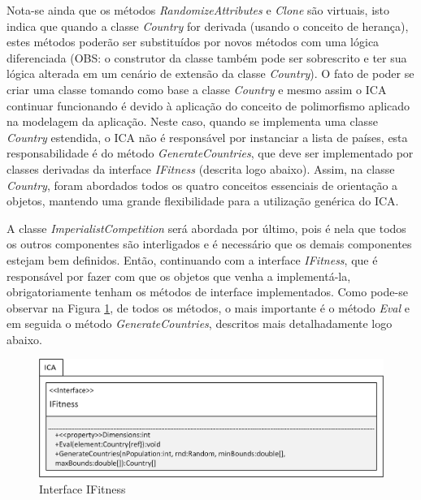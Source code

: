 Nota-se ainda que os métodos \emph{RandomizeAttributes} e \emph{Clone} são virtuais, isto indica que quando a classe \emph{Country} for derivada (usando o conceito de herança), estes métodos poderão ser substituídos por novos métodos com uma lógica diferenciada (OBS: o construtor da classe também pode ser sobrescrito e ter sua lógica alterada em um cenário de extensão da classe \emph{Country}). O fato de poder se criar uma classe tomando como base a classe \emph{Country} e mesmo assim o ICA continuar funcionando é devido à aplicação do conceito de polimorfismo aplicado na modelagem da aplicação. Neste caso, quando se implementa uma classe\emph{ Country} estendida, o ICA não é responsável por instanciar a lista de países, esta responsabilidade é do método \emph{GenerateCountries}, que deve ser implementado por classes derivadas da interface \emph{IFitness} (descrita logo abaixo). Assim, na classe \emph{Country}, foram abordados todos os quatro conceitos essenciais de orientação a objetos, mantendo uma grande flexibilidade para a utilização genérica do ICA.    

A classe \emph{ImperialistCompetition} será abordada por último, pois é nela que todos os outros componentes são interligados e é necessário que os demais componentes estejam bem definidos. Então, continuando com a interface \emph{IFitness}, que é responsável por fazer com que os objetos que venha a implementá-la, obrigatoriamente tenham os métodos de interface implementados. Como pode-se observar na Figura \ref{fig:ClassesICA-IFitness}, de todos os métodos, o mais importante é o método \emph{Eval} e em seguida o método \emph{GenerateCountries}, descritos mais detalhadamente logo abaixo.


\begin{figure}[h]
	\centering	
	\includegraphics[scale=1]{Figuras/ClassesICA-IFitness.png}
	\caption{Interface IFitness}
	\label{fig:ClassesICA-IFitness}
	\end{figure}



